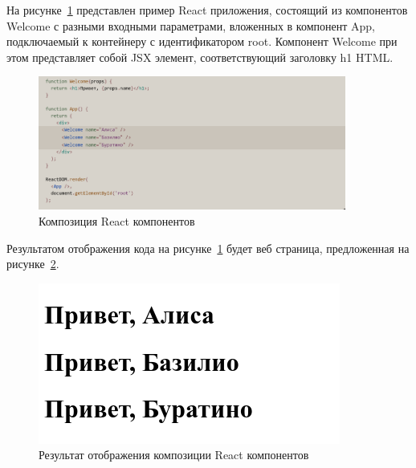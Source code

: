 На рисунке~\ref{img:react__components_composition} представлен пример React приложения, состоящий из компонентов Welcome с разными входными параметрами, вложенных в компонент App, подключаемый к контейнеру с идентификатором root. Компонент Welcome при этом представляет собой JSX элемент, соответствующий заголовку h1 HTML.

\begin{figure}[H]
  \centering
  \includegraphics[width=0.9\textwidth]{assets/images/theoretical2/components__composition.png}
  \caption{Композиция React компонентов}
  \label{img:react__components_composition}
\end{figure}

Результатом отображения кода на рисунке~\ref{img:react__components_composition} будет веб страница, предложенная на рисунке~\ref{img:react__components_composition-result}.

\begin{figure}[H]
  \centering
  \includegraphics[height=0.25\textheight]{assets/images/theoretical2/components__composition-result.png}
  \caption{Результат отображения композиции React компонентов}
  \label{img:react__components_composition-result}
\end{figure}